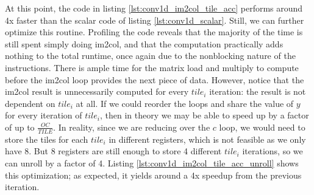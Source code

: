 \documentclass[acmsmall, nonacm=true]{acmart}
\begin{document}
At this point, the code in listing \ref{lst:conv1d_im2col_tile_acc} performs around 4x faster than the scalar code of listing \ref{lst:conv1d_scalar}. Still, we can further optimize this routine. Profiling the code reveals that the majority of the time is still spent simply doing im2col, and that the computation practically adds nothing to the total runtime, once again due to the nonblocking nature of the instructions. There is ample time for the matrix load and multiply to compute before the im2col loop provides the next piece of data. However, notice that the im2col result is unnecessarily computed for every $tile_i$ iteration: the result is not dependent on $tile_i$ at all. If we could reorder the loops and share the value of $y$ for every iteration of $tile_i$, then in theory we may be able to speed up by a factor of up to $\frac{OC}{TILE}$. In reality, since we are reducing over the $c$ loop, we would need to store the tiles for each $tile_i$ in different registers, which is not feasible as we only have 8. But 8 registers are still enough to store 4 different $tile_i$ iterations, so we can unroll by a factor of 4. Listing \ref{lst:conv1d_im2col_tile_acc_unroll} shows this optimization; as expected, it yields around a 4x speedup from the previous iteration.
\end{document}
